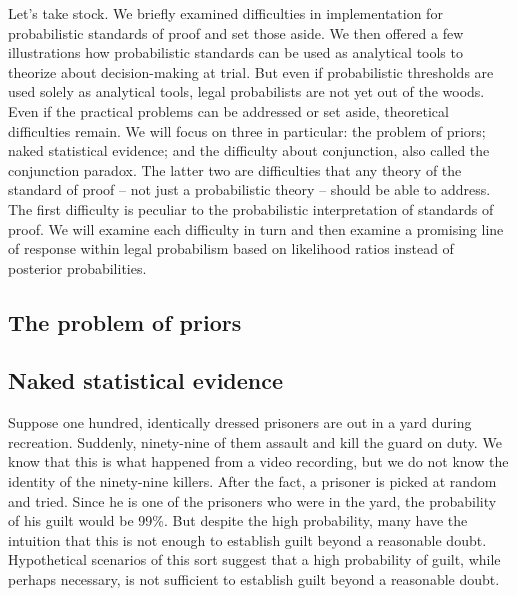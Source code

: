 \documentclass[10pt,dvipsnames,enabledeprecatedfontcommands]{scrartcl}
\begin{document}
Let's take stock. We briefly examined difficulties in implementation for
probabilistic standards of proof and set those aside. We then offered a
few illustrations how probabilistic standards can be used as analytical
tools to theorize about decision-making at trial. But even if
probabilistic thresholds are used solely as analytical tools, legal
probabilists are not yet out of the woods. Even if the practical
problems can be addressed or set aside, theoretical difficulties remain.
We will focus on three in particular: the problem of priors; naked
statistical evidence; and the difficulty about conjunction, also called
the conjunction paradox. The latter two are difficulties that any theory
of the standard of proof -- not just a probabilistic theory -- should be
able to address. The first difficulty is peculiar to the probabilistic
interpretation of standards of proof. We will examine each difficulty in
turn and then examine a promising line of response within legal
probabilism based on likelihood ratios instead of posterior
probabilities.

\hypertarget{the-problem-of-priors}{%
\subsection{The problem of priors}\label{the-problem-of-priors}}

\hypertarget{naked-statistical-evidence}{%
\subsection{Naked statistical
evidence}\label{naked-statistical-evidence}}

Suppose one hundred, identically dressed prisoners are out in a yard
during recreation. Suddenly, ninety-nine of them assault and kill the
guard on duty. We know that this is what happened from a video
recording, but we do not know the identity of the ninety-nine killers.
After the fact, a prisoner is picked at random and tried. Since he is
one of the prisoners who were in the yard, the probability of his guilt
would be 99\%. But despite the high probability, many have the intuition
that this is not enough to establish guilt beyond a reasonable doubt.
Hypothetical scenarios of this sort suggest that a high probability of
guilt, while perhaps necessary, is not sufficient to establish guilt
beyond a reasonable doubt.
\end{document}
